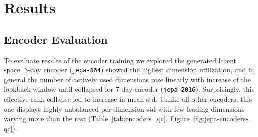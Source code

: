 \documentclass[11pt,a4paper]{article}
\begin{document}



\section{Results}
\subsection{Encoder Evaluation}

To evaluate results of the encoder training we explored the generated latent space. 3-day encoder (\texttt{jepa-864}) showed the highest dimension utilization, and in general the number of actively used dimensions rose linearly with increase of the lookback window until collapsed for 7-day encoder (\texttt{jepa-2016}). Surprisingly, this effective rank collapse led to increase in mean std. Unlike all other encoders, this one displays highly unbalanced per-dimension std with few leading dimensions varying more than the rest (Table~\ref{tab:encoders_qc}, Figure~\ref{fig:jepa-encoders-qc}). 
\end{document}
